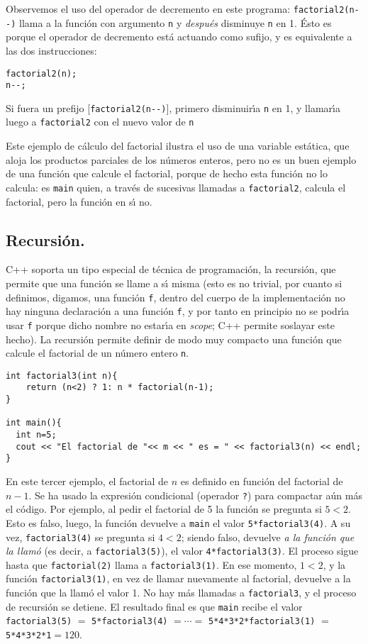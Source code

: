 Observemos el uso del operador de decremento en este programa:
\verb+factorial2(n--)+ llama a la funci\'on con argumento \verb+n+ y
{\em despu\'es\/} disminuye \verb+n+ en 1. \'Esto es porque el
operador de decremento est\'a actuando como sufijo, y es equivalente a
las dos instrucciones:
\begin{verbatim}
factorial2(n);
n--;
\end{verbatim}
Si fuera un prefijo [\verb+factorial2(n--)+], primero disminuir\'{\i}a
\verb+n+ en 1, y llamar\'{\i}a luego a \verb+factorial2+ con el nuevo valor
de \verb+n+

Este ejemplo de c\'alculo del factorial ilustra el uso de una variable
est\'atica, que aloja los productos parciales de los n\'umeros
enteros, pero no es un buen ejemplo de una funci\'on que calcule el
factorial, porque de hecho esta funci\'on no lo calcula: es
\verb+main+ quien, a trav\'es de sucesivas llamadas a
\verb+factorial2+, calcula el factorial, pero la funci\'on en s\'{\i}
no. 


\subsection{Recursi{\'o}n.}

C++ soporta un tipo especial de t{\'e}cnica de programaci{\'o}n, la
recursi{\'o}n, que permite que una funci{\'o}n se llame a s\'{\i}
misma (esto es no trivial, por cuanto si definimos, digamos, una
funci\'on \verb+f+, dentro del cuerpo de la implementaci\'on no hay
ninguna declaraci\'on a una funci\'on \verb+f+, y por tanto en
principio no se podr\'{\i}a usar \verb+f+ porque dicho nombre no
estar\'{\i}a en {\em scope\/}; C++ permite soslayar este hecho).
La recursi\'on 
permite definir de modo muy compacto una funci{\'o}n que calcule
el factorial de un n{\'u}mero entero \verb+n+.
\begin{verbatim}
int factorial3(int n){
    return (n<2) ? 1: n * factorial(n-1);
}

int main(){
  int n=5;
  cout << "El factorial de "<< m << " es = " << factorial3(n) << endl; 
}
\end{verbatim}

En este tercer ejemplo, el factorial de $n$ es definido en funci\'on del
factorial de $n-1$. Se ha usado la expresi\'on condicional (operador
\verb+?+) para compactar a\'un m\'as el c\'odigo. Por ejemplo, al
pedir el factorial de 5 la funci\'on se pregunta si $5<2$. Esto es
falso, luego, la funci\'on devuelve a \verb+main+ el valor
\verb+5*factorial3(4)+. A su vez, \verb+factorial3(4)+ se pregunta si
$4<2$; siendo falso, devuelve {\em a la funci\'on que la llam\'o\/}
(es decir, a \verb+factorial3(5)+), el valor \verb+4*factorial3(3)+. El
proceso sigue hasta que \verb+factorial(2)+ llama a
\verb+factorial3(1)+. En ese momento, $1<2$, y la funci\'on
\verb+factorial3(1)+, en vez de llamar nuevamente al factorial,
devuelve a la funci\'on que la llam\'o el valor 1. No hay m\'as
llamadas a \verb+factorial3+, y el proceso de recursi\'on se
detiene. El resultado final es que \verb+main+ recibe el valor
\verb+factorial3(5)+ $=$ \verb+5*factorial3(4)+ $=\cdots=$
\verb+5*4*3*2*factorial3(1)+ $=$ \verb+5*4*3*2*1+$=120$.


